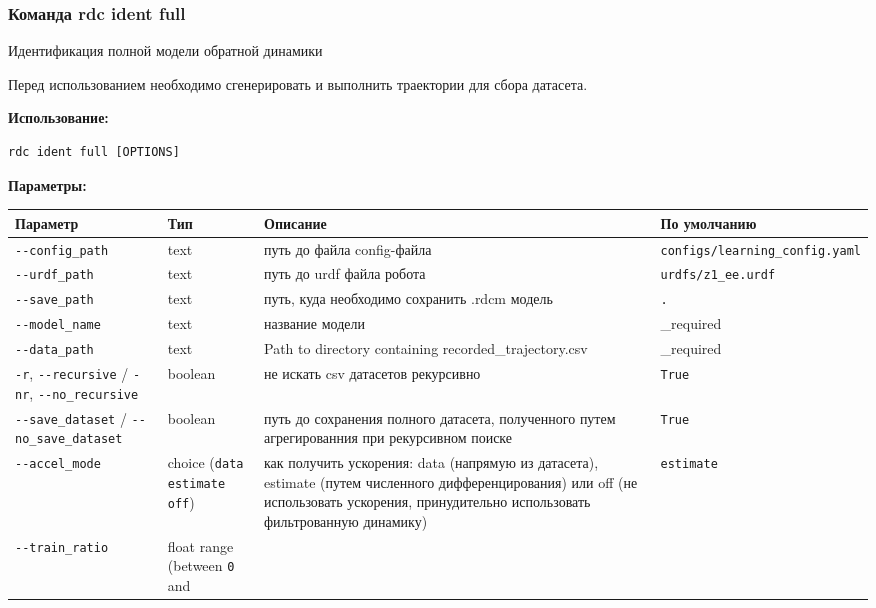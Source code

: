\hypertarget{rdc-ident-full}{%
\subsubsection{ Команда rdc ident full}\label{rdc-ident-full}}

Идентификация полной модели обратной динамики

Перед использованием необходимо сгенерировать и выполнить траектории для сбора датасета.

\textbf{Использование:}
\begin{lstlisting}[language=python, numbers=none, frame=single]
rdc ident full [OPTIONS]
\end{lstlisting}

\textbf{Параметры:}
\begin{center}
\fontsize{10pt}{10pt}\selectfont
\begin{longtable}[]{p{5cm}|p{2cm}|p{3.5cm}|p{5cm}}
    \hline
\toprule()
Параметр & Тип & Описание & По умолчанию \\
\hline
\midrule()
\endhead
\texttt{-\/-config\_path} & text & путь до файла config-файла &
\texttt{configs/learning\_config.yaml} \\
\hline
\texttt{-\/-urdf\_path} & text & путь до urdf файла робота &
\texttt{urdfs/z1\_ee.urdf} \\
\hline
\texttt{-\/-save\_path} & text & путь, куда необходимо сохранить .rdcm модель &
\texttt{.} \\
\hline
\texttt{-\/-model\_name} & text & название модели & \_required \\
\hline
\texttt{-\/-data\_path} & text & Path to directory containing
recorded\_trajectory.csv & \_required \\
\hline
\texttt{-r}, \texttt{-\/-recursive} / \texttt{-nr},
\texttt{-\/-no\_recursive} & boolean & не искать csv датасетов рекурсивно &
\texttt{True} \\
\hline
\texttt{-\/-save\_dataset} / \texttt{-\/-no\_save\_dataset} & boolean &
путь до сохранения полного датасета, полученного путем агрегированния при рекурсивном поиске& \texttt{True} \\
\hline
\texttt{-\/-accel\_mode} & choice (\texttt{data} \textbar{}
\texttt{estimate} \textbar{} \texttt{off}) & как получить ускорения: data (напрямую из датасета), estimate (путем численного дифференцирования) или off (не использовать ускорения, принудительно использовать фильтрованную динамику) & \texttt{estimate} \\
\hline
\texttt{-\/-train\_ratio} & float range (between \texttt{0} and

\end{longtable}
\end{center}
